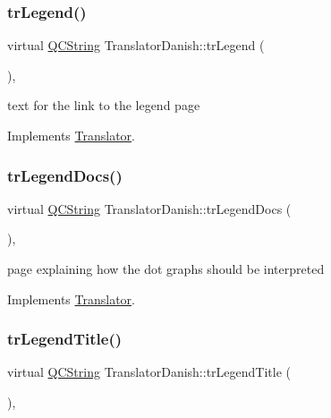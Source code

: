 \subsubsection{\texorpdfstring{trLegend()}{trLegend()}}
{\footnotesize\ttfamily virtual \mbox{\hyperlink{class_q_c_string}{Q\+C\+String}} Translator\+Danish\+::tr\+Legend (\begin{DoxyParamCaption}{ }\end{DoxyParamCaption})\hspace{0.3cm}{\ttfamily [inline]}, {\ttfamily [virtual]}}

text for the link to the legend page 

Implements \mbox{\hyperlink{class_translator}{Translator}}.

\mbox{\label{class_translator_danish_a2ec816acf5677a0596d056812f35fd2c}} 
\subsubsection{\texorpdfstring{trLegendDocs()}{trLegendDocs()}}
{\footnotesize\ttfamily virtual \mbox{\hyperlink{class_q_c_string}{Q\+C\+String}} Translator\+Danish\+::tr\+Legend\+Docs (\begin{DoxyParamCaption}{ }\end{DoxyParamCaption})\hspace{0.3cm}{\ttfamily [inline]}, {\ttfamily [virtual]}}

page explaining how the dot graph\textquotesingle{}s should be interpreted 

Implements \mbox{\hyperlink{class_translator}{Translator}}.

\mbox{\label{class_translator_danish_a4b7e314fb2afe267abff3d12cb389cde}} 
\subsubsection{\texorpdfstring{trLegendTitle()}{trLegendTitle()}}
{\footnotesize\ttfamily virtual \mbox{\hyperlink{class_q_c_string}{Q\+C\+String}} Translator\+Danish\+::tr\+Legend\+Title (\begin{DoxyParamCaption}{ }\end{DoxyParamCaption})\hspace{0.3cm}{\ttfamily [inline]}, {\ttfamily [virtual]}}

